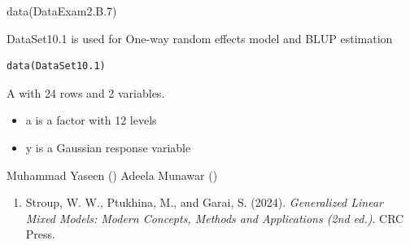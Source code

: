 \documentclass[a4paper]{book}
\begin{document}
%
\begin{SeeAlso}
\end{SeeAlso}
%
\begin{Examples}
\begin{ExampleCode}
data(DataExam2.B.7)
\end{ExampleCode}
\end{Examples}
%
\begin{Description}
DataSet10.1 is used for One-way random effects model and BLUP estimation
\end{Description}
%
\begin{Usage}
\begin{verbatim}
data(DataSet10.1)
\end{verbatim}
\end{Usage}
%
\begin{Format}
A  with 24 rows and 2 variables.
\end{Format}
%
\begin{Details}
\begin{itemize}

\item{} a  is a factor with 12 levels
\item{} y  is a Gaussian response variable

\end{itemize}

\end{Details}
%
\begin{Author}
Muhammad Yaseen ()
Adeela Munawar ()
\end{Author}
%
\begin{References}
\begin{enumerate}

\item{} Stroup, W. W., Ptukhina, M., and Garai, S. (2024).
\emph{Generalized Linear Mixed Models: Modern Concepts, Methods and Applications (2nd ed.)}.
CRC Press.

\end{enumerate}

\end{References}
%
\begin{SeeAlso}
\end{SeeAlso}
\end{document}
